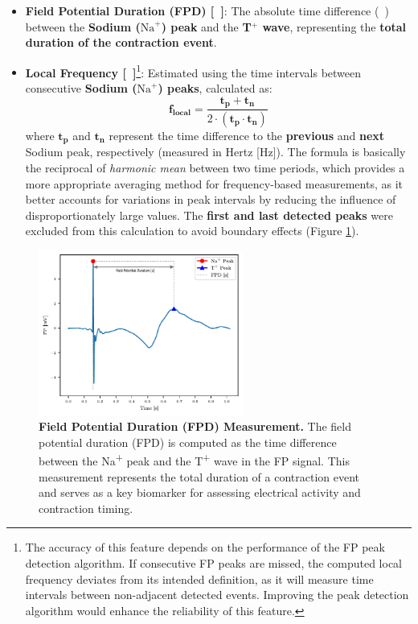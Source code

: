 \documentclass{report}
\begin{document}
            \begin{itemize}
                \item \textbf{Field Potential Duration (FPD) [\SI{}{\textbf{\s}}]}: The absolute time difference (\SI{}{\textbf{\s}}) between the \textbf{Sodium (\(\text{Na}^+\)) peak} and the \textbf{T\(^+\) wave}, representing the \textbf{total duration of the contraction event}.
                \item \textbf{Local Frequency [\SI{}{\textbf{\hertz}}]}\footnote{The accuracy of this feature depends on the performance of the FP peak detection algorithm. If consecutive FP peaks are missed, the computed local frequency deviates from its intended definition, as it will measure time intervals between non-adjacent detected events. Improving the peak detection algorithm would enhance the reliability of this feature.}: Estimated using the time intervals between consecutive \textbf{Sodium (\(\text{Na}^+\)) peaks}, calculated as:
                \[
                \bm{f_{\text{local}}} = \frac{\bm{t_p + t_n}}{2 \cdot (\bm{t_p} \cdot \bm{t_n})}
                \]
                where \(\bm{t_p}\) and \(\bm{t_n}\) represent the time difference to the \textbf{previous} and \textbf{next} Sodium peak, respectively (measured in Hertz [Hz]). The formula is basically the reciprocal of \textit{harmonic mean} between two time periods, which provides a more appropriate averaging method for frequency-based measurements, as it better accounts for variations in peak intervals by reducing the influence of disproportionately large values. The \textbf{first and last detected peaks} were excluded from this calculation to avoid boundary effects (Figure \ref{fig:fp-definiton}).
            \end{itemize}

             \begin{figure}[H]
                \centering
                \includegraphics[width=0.6\textwidth]{plots/chapter_3/fp-duration-annotated.pdf}
                    \caption[Field Potential Duration Measurement]{\textbf{Field Potential Duration (FPD) Measurement.} The field potential duration (FPD) is computed as the time difference between the Na\textsuperscript{+} peak and the T\textsuperscript{+} wave in the FP signal. This measurement represents the total duration of a contraction event and serves as a key biomarker for assessing electrical activity and contraction timing.}
                \label{fig:fp-definiton}
            \end{figure}
        
\end{document}
